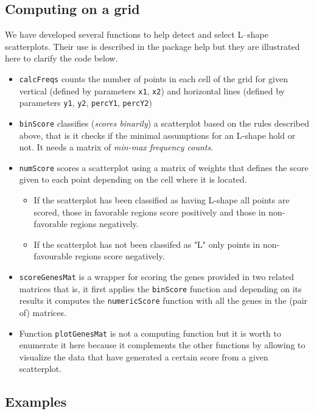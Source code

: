 \documentclass[a4paper,10pt]{article}\usepackage[]{graphicx}\usepackage[]{xcolor}
\begin{document}
\subsection{Computing on a grid}

We have developed several functions to help detect and select L--shape scatterplots.
Their use is described in the package help but they are illustrated here to clarify the code below.

\begin{itemize}
\item \texttt{calcFreqs} counts the number of points in each cell of the grid for given vertical (defined by parameters \texttt{x1}, \texttt{x2}) and horizontal lines (defined by parameters \texttt{y1}, \texttt{y2}, \texttt{percY1}, \texttt{percY2}) 
\item \texttt{binScore} classifies (\emph{scores binarily}) a scatterplot based on the rules described above, that is it checks if the minimal assumptions for an L-shape hold or not. It needs a matrix of \emph{min-max frequency counts}.
\item \texttt{numScore} scores a scatterplot using a matrix of weights that defines the score given to each point depending on the cell where it is located. 
\begin{itemize}
  \item If the scatterplot has been classified as having L-shape all points are scored, those in favorable regions score positively and those in non-favorable regions negatively. 
  \item If the scatterplot has not been classifed as "L" only points in non-favourable regions score negatively. 
\end{itemize}
\item \texttt{scoreGenesMat} is a wrapper for scoring the genes provided in two related matrices that is, it first applies the \texttt{binScore} function and depending on its results it computes the \texttt{numericScore} function with all the genes in the (pair of) matrices.
\item Function \texttt{plotGenesMat} is not a computing function but it is worth to enumerate it here because it complements the other functions by allowing to visualize the data that have generated a certain score from a given scatterplot.
\end{itemize}

\subsection{Examples}
\end{document}
